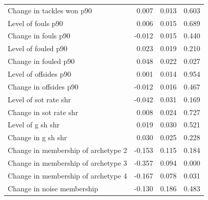 \begin{tabular}{lrrr}
Change in tackles won p90 & 0.007 & 0.013 & 0.603 \\
Level of fouls p90 & 0.006 & 0.015 & 0.689 \\
Change in fouls p90 & -0.012 & 0.015 & 0.440 \\
Level of fouled p90 & 0.023 & 0.019 & 0.210 \\
Change in fouled p90 & 0.048 & 0.022 & 0.027 \\
Level of offsides p90 & 0.001 & 0.014 & 0.954 \\
Change in offsides p90 & -0.012 & 0.016 & 0.467 \\
Level of sot rate shr & -0.042 & 0.031 & 0.169 \\
Change in sot rate shr & 0.008 & 0.024 & 0.727 \\
Level of g sh shr & 0.019 & 0.030 & 0.521 \\
Change in g sh shr & 0.030 & 0.025 & 0.228 \\
Change in membership of archetype 2 & -0.153 & 0.115 & 0.184 \\
Change in membership of archetype 3 & -0.357 & 0.094 & 0.000 \\
Change in membership of archetype 4 & -0.167 & 0.078 & 0.031 \\
Change in noise membership & -0.130 & 0.186 & 0.483 \\
\bottomrule
\end{tabular}
